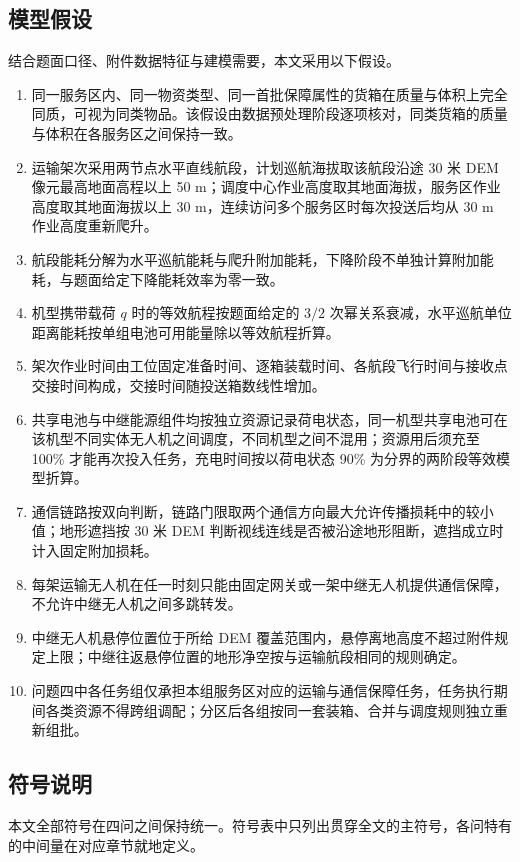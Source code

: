 \documentclass[bwprint]{gmcmthesis}
\begin{document}
\subsection{模型假设}
结合题面口径、附件数据特征与建模需要，本文采用以下假设。

\begin{enumerate}
\item 同一服务区内、同一物资类型、同一首批保障属性的货箱在质量与体积上完全同质，可视为同类物品。该假设由数据预处理阶段逐项核对，同类货箱的质量与体积在各服务区之间保持一致。
\item 运输架次采用两节点水平直线航段，计划巡航海拔取该航段沿途 30 米 DEM 像元最高地面高程以上 50 m；调度中心作业高度取其地面海拔，服务区作业高度取其地面海拔以上 30 m，连续访问多个服务区时每次投送后均从 30 m 作业高度重新爬升。
\item 航段能耗分解为水平巡航能耗与爬升附加能耗，下降阶段不单独计算附加能耗，与题面给定下降能耗效率为零一致。
\item 机型携带载荷 $q$ 时的等效航程按题面给定的 $3/2$ 次幂关系衰减，水平巡航单位距离能耗按单组电池可用能量除以等效航程折算。
\item 架次作业时间由工位固定准备时间、逐箱装载时间、各航段飞行时间与接收点交接时间构成，交接时间随投送箱数线性增加。
\item 共享电池与中继能源组件均按独立资源记录荷电状态，同一机型共享电池可在该机型不同实体无人机之间调度，不同机型之间不混用；资源用后须充至 100\% 才能再次投入任务，充电时间按以荷电状态 90\% 为分界的两阶段等效模型折算。
\item 通信链路按双向判断，链路门限取两个通信方向最大允许传播损耗中的较小值；地形遮挡按 30 米 DEM 判断视线连线是否被沿途地形阻断，遮挡成立时计入固定附加损耗。
\item 每架运输无人机在任一时刻只能由固定网关或一架中继无人机提供通信保障，不允许中继无人机之间多跳转发。
\item 中继无人机悬停位置位于所给 DEM 覆盖范围内，悬停离地高度不超过附件规定上限；中继往返悬停位置的地形净空按与运输航段相同的规则确定。
\item 问题四中各任务组仅承担本组服务区对应的运输与通信保障任务，任务执行期间各类资源不得跨组调配；分区后各组按同一套装箱、合并与调度规则独立重新组批。
\end{enumerate}

\subsection{符号说明}
本文全部符号在四问之间保持统一。符号表中只列出贯穿全文的主符号，各问特有的中间量在对应章节就地定义。
\end{document}

